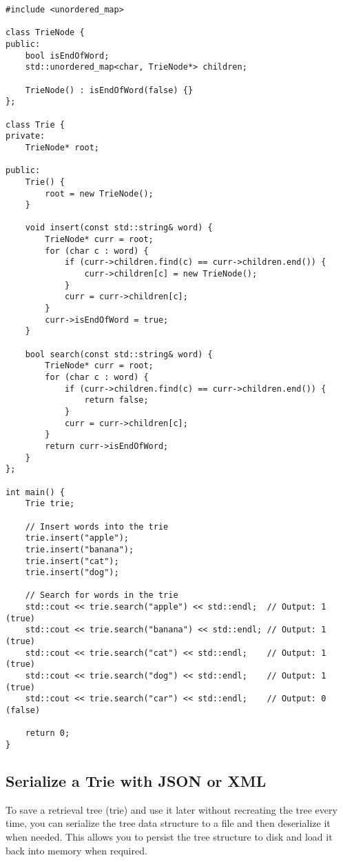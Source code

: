 \begin{verbatim}
#include <unordered_map>

class TrieNode {
public:
    bool isEndOfWord;
    std::unordered_map<char, TrieNode*> children;

    TrieNode() : isEndOfWord(false) {}
};

class Trie {
private:
    TrieNode* root;

public:
    Trie() {
        root = new TrieNode();
    }

    void insert(const std::string& word) {
        TrieNode* curr = root;
        for (char c : word) {
            if (curr->children.find(c) == curr->children.end()) {
                curr->children[c] = new TrieNode();
            }
            curr = curr->children[c];
        }
        curr->isEndOfWord = true;
    }

    bool search(const std::string& word) {
        TrieNode* curr = root;
        for (char c : word) {
            if (curr->children.find(c) == curr->children.end()) {
                return false;
            }
            curr = curr->children[c];
        }
        return curr->isEndOfWord;
    }
};

int main() {
    Trie trie;
    
    // Insert words into the trie
    trie.insert("apple");
    trie.insert("banana");
    trie.insert("cat");
    trie.insert("dog");
    
    // Search for words in the trie
    std::cout << trie.search("apple") << std::endl;  // Output: 1 (true)
    std::cout << trie.search("banana") << std::endl; // Output: 1 (true)
    std::cout << trie.search("cat") << std::endl;    // Output: 1 (true)
    std::cout << trie.search("dog") << std::endl;    // Output: 1 (true)
    std::cout << trie.search("car") << std::endl;    // Output: 0 (false)

    return 0;
}
\end{verbatim}

\subsection{Serialize a Trie with JSON or XML}

To save a retrieval tree (trie) and use it later without recreating the tree every time, you can serialize the tree data structure to a file and then deserialize it when needed. This allows you to persist the tree structure to disk and load it back into memory when required.

